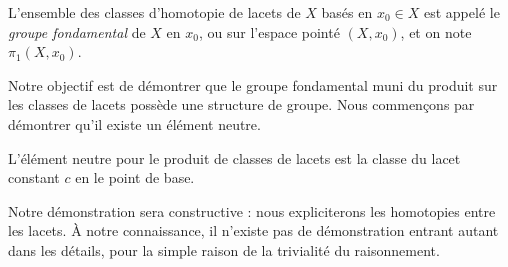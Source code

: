 \begin{definition}
L'ensemble des classes d'homotopie de lacets de $X$ basés en $x_0\in X$ est appelé le \emph{groupe fondamental} de $X$ en $x_0$, ou sur l'espace pointé $(X,x_0)$, et on note $\pi_1(X,x_0)$.
\end{definition}

Notre objectif est de démontrer que le groupe fondamental muni du produit sur les classes de lacets possède une structure de groupe. Nous commençons par démontrer qu'il existe un élément neutre.

\begin{lemma}
L'élément neutre pour le produit de classes de lacets est la classe du lacet constant $c$ en le point de base.
\end{lemma}

Notre démonstration sera constructive : nous expliciterons les homotopies entre les lacets. À notre connaissance, il n'existe pas de démonstration entrant autant dans les détails, pour la simple raison de la trivialité du raisonnement.

